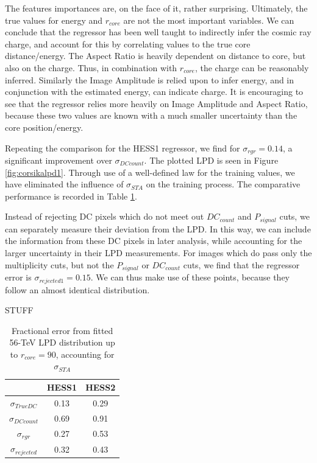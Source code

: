 \documentclass[11pt]{article}
\begin{document}
The features importances are, on the face of it, rather surprising. Ultimately, the true values for energy and $r_{core}$ are not the most important variables. We can conclude that the regressor has been well taught to indirectly infer the cosmic ray charge, and account for this by correlating values to the true core distance/energy. The Aspect Ratio is heavily dependent on distance to core, but also on the charge. Thus, in combination with $r_{core}$, the charge can be reasonably inferred. Similarly the Image Amplitude is relied upon to infer energy, and in conjunction with the estimated energy, can indicate charge. It is encouraging to see that the regressor relies more heavily on Image Amplitude and Aspect Ratio, because these two values are known with a much smaller uncertainty than the core position/energy.

Repeating the comparison for the HESS1 regressor, we find for $\sigma_{rgr} = 0.14$, a significant improvement over $\sigma_{DCcount}$. The plotted LPD is seen in Figure \ref{fig:corsikalpd1}. Through use of a well-defined law for the training values, we have eliminated the influence of $\sigma_{STA}$ on the training process. The comparative performance is recorded in Table \ref{tab:lpderror}.

Instead of rejecting DC pixels which do not meet out $DC_{count}$ and $P_{signal}$ cuts, we can separately measure their deviation from the LPD. In this way, we can include the information from these DC pixels in later analysis, while accounting for the larger uncertainty in their LPD measurements. For images which do pass only the multiplicity cuts, but not the $P_{signal}$ or $DC_{count}$ cuts, we find that the regressor error is $\sigma_{rejected1}=0.15$. We can thus make use of these points, because they follow an almost identical distribution. 

STUFF

\begin{table}[h!]
  \centering
  \caption{Fractional error from fitted 56-TeV LPD distribution up to $r_{core}=90$, accounting for $\sigma_{STA}$}
  \label{tab:lpderror}
  \begin{tabular}{ccc}
    \toprule
    & HESS1 & HESS2\\
    \midrule
    $\sigma_{TrueDC}$ & 0.13 & 0.29\\
    $\sigma_{DCcount}$ & 0.69 & 0.91\\
    $\sigma_{rgr}$ & 0.27 & 0.53\\ 
    $\sigma_{rejected}$ & 0.32 & 0.43\\ 
    \bottomrule
  \end{tabular}
\end{table}
\end{document}
